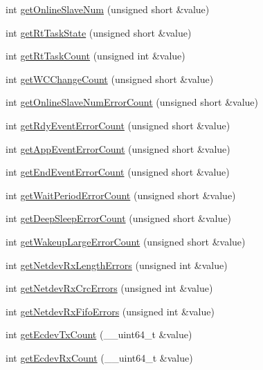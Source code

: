 \begin{DoxyCompactItemize}
int \hyperlink{classCUIEcat_a4a6ae9ad418142c1e048686063eab64d}{get\-Online\-Slave\-Num} (unsigned short \&value)
\item 
int \hyperlink{classCUIEcat_a63e237aae8398d348bf306a32644eac4}{get\-Rt\-Task\-State} (unsigned short \&value)
\item 
int \hyperlink{classCUIEcat_afa6be9b91db04dd2f80dc0abc401a305}{get\-Rt\-Task\-Count} (unsigned int \&value)
\item 
int \hyperlink{classCUIEcat_aba200a70bcdff42fad9ec5faef6017ad}{get\-W\-C\-Change\-Count} (unsigned short \&value)
\item 
int \hyperlink{classCUIEcat_affb9c24adc1110db865fe12a205c9e75}{get\-Online\-Slave\-Num\-Error\-Count} (unsigned short \&value)
\item 
int \hyperlink{classCUIEcat_a63b3686e23653058635c9d7c1cf26252}{get\-Rdy\-Event\-Error\-Count} (unsigned short \&value)
\item 
int \hyperlink{classCUIEcat_a20d8ed1c0b3d2cafbd98864f969677a5}{get\-App\-Event\-Error\-Count} (unsigned short \&value)
\item 
int \hyperlink{classCUIEcat_a49fba779055b9959e804b3d6587f9799}{get\-End\-Event\-Error\-Count} (unsigned short \&value)
\item 
int \hyperlink{classCUIEcat_a721382e4e2624ec021cda4a173b5fa6c}{get\-Wait\-Period\-Error\-Count} (unsigned short \&value)
\item 
int \hyperlink{classCUIEcat_a8957db458414aa0a3d4e8af9167b5a63}{get\-Deep\-Sleep\-Error\-Count} (unsigned short \&value)
\item 
int \hyperlink{classCUIEcat_a7cd108133cfbb78d08fec432de8d79f4}{get\-Wakeup\-Large\-Error\-Count} (unsigned short \&value)
\item 
int \hyperlink{classCUIEcat_ab9db5ac7dfc636819b1ece43d35ba7f4}{get\-Netdev\-Rx\-Length\-Errors} (unsigned int \&value)
\item 
int \hyperlink{classCUIEcat_a9a6d7227eb81138a671e936dae1488ea}{get\-Netdev\-Rx\-Crc\-Errors} (unsigned int \&value)
\item 
int \hyperlink{classCUIEcat_a6bb2c05f044bf6c0766b50027dc454e7}{get\-Netdev\-Rx\-Fifo\-Errors} (unsigned int \&value)
\item 
int \hyperlink{classCUIEcat_a761302de2176ec87fbe3fd74609f70dd}{get\-Ecdev\-Tx\-Count} (\-\_\-\-\_\-uint64\-\_\-t \&value)
\item 
int \hyperlink{classCUIEcat_af0f350ed72a6a541ded432cbf4c70e56}{get\-Ecdev\-Rx\-Count} (\-\_\-\-\_\-uint64\-\_\-t \&value)
\item 

\end{DoxyCompactItemize}
